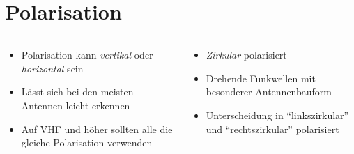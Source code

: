 
\section{Polarisation}
\label{section:polarisation}
\begin{frame}%

\begin{columns}
    \begin{column}{0.48\textwidth}
    \begin{itemize}
  \item Polarisation kann \emph{vertikal} oder \emph{horizontal} sein
  \item Lässt sich bei den meisten Antennen leicht erkennen
  \item Auf VHF und höher sollten alle die gleiche Polarisation verwenden
  \end{itemize}

    \end{column}
   \begin{column}{0.48\textwidth}
       \begin{itemize}
  \item \emph{Zirkular} polarisiert
  \item Drehende Funkwellen mit besonderer Antennenbauform
  \item Unterscheidung in \enquote{linkszirkular} und \enquote{rechtszirkular} polarisiert
  \end{itemize}

   \end{column}
\end{columns}

\end{frame}

